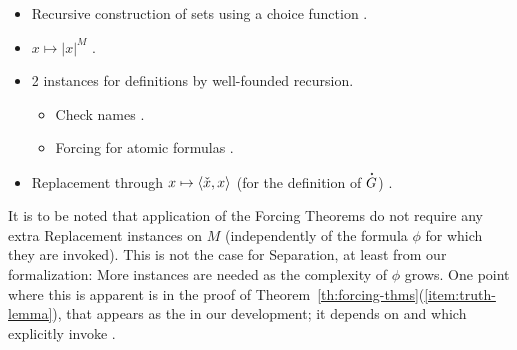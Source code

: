 \begin{itemize}
\item Recursive construction of sets using a choice function
  .
\item $x\mapsto |x|^M$
  .
\item 2 instances for definitions by well-founded recursion.
  \begin{itemize}
  \item
    Check names
    .
  \item Forcing for atomic formulas
    .
  \end{itemize}
\item Replacement through $x\mapsto \langle\check{x},x\rangle$ (for the
  definition of $\punto{G}$)
  .
\end{itemize}

It is to be noted that application of the Forcing Theorems do not
require any extra Replacement instances on $M$ (independently of the
formula $\phi$ for which they are invoked). This is not the case for
Separation, at least from our formalization: More instances are needed
as the complexity of $\phi$ grows. One point where this is apparent is
in the proof of Theorem~\ref{th:forcing-thms}(\ref{item:truth-lemma}),
that appears as the  in our development; it
depends on  and
 which explicitly invoke
.


